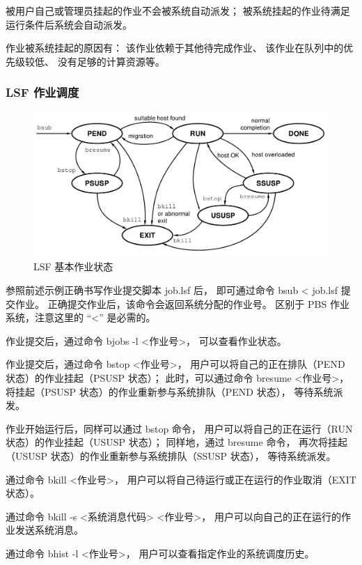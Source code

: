 \documentclass[UTF8]{ctexart}
\newcommand{\mynnote}[1]{\colorbox{gray!15}{\color{red}#1}}
\begin{document}
被用户自己或管理员挂起的作业不会被系统自动派发；
被系统挂起的作业待满足运行条件后系统会自动派发。

作业被系统挂起的原因有：
该作业依赖于其他待完成作业、
该作业在队列中的优先级较低、
没有足够的计算资源等。

\subsubsection{LSF 作业调度}
\begin{figure}[h]
  \centering
  \includegraphics[width=140mm]{material/bjobstate.png}
  \caption{LSF 基本作业状态}
\end{figure}

参照前述示例正确书写作业提交脚本 job.lsf 后，
即可通过命令 \mynnote{bsub < job.lsf} 提交作业。
正确提交作业后，该命令会返回系统分配的作业号。
区别于 PBS 作业系统，注意这里的 ``<'' 是必需的。

作业提交后，通过命令 \mynnote{bjobs -l <作业号>}，
可以查看作业状态。

作业提交后，通过命令 \mynnote{bstop <作业号>}，
用户可以将自己的正在排队（PEND 状态）的作业挂起（PSUSP 状态）；
此时，可以通过命令 \mynnote{bresume <作业号>}，
将挂起（PSUSP 状态）的作业重新参与系统排队（PEND 状态），
等待系统派发。

作业开始运行后，同样可以通过 bstop 命令，
用户可以将自己的正在运行（RUN 状态）的作业挂起（USUSP 状态）；
同样地，通过 bresume 命令，
再次将挂起（USUSP 状态）的作业重新参与系统排队（SSUSP 状态），
等待系统派发。

通过命令 \mynnote{bkill <作业号>}，
用户可以将自己待运行或正在运行的作业取消（EXIT 状态）。

通过命令 \mynnote{bkill -s <系统消息代码> <作业号>}，
用户可以向自己的正在运行的作业发送系统消息。

通过命令 \mynnote{bhist -l <作业号>}，
用户可以查看指定作业的系统调度历史。
\end{document}
